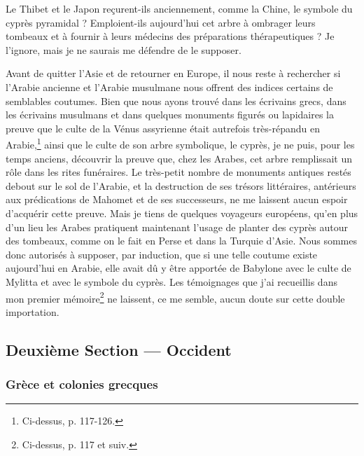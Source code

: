 \documentclass{article}
\begin{document}
Le Thibet et le Japon reçurent-ils anciennement, comme la Chine, le symbole du cyprès pyramidal ? Emploient-ils aujourd'hui cet arbre à ombrager leurs tombeaux et à fournir à leurs médecins des préparations thérapeutiques ? Je l'ignore, mais je ne saurais me défendre de le supposer.

Avant de quitter l'Asie et de retourner en Europe, il nous reste à rechercher si l'Arabie ancienne et l'Arabie musulmane nous offrent des indices certains de semblables coutumes. Bien que nous ayons trouvé dans les écrivains grecs, dans les écrivains musulmans et dans quelques monuments figurés ou lapidaires la preuve que le culte de la Vénus assyrienne était autrefois très-répandu en Arabie,\footnote{Ci-dessus, p. 117-126.} ainsi que le culte de son arbre symbolique, le cyprès, je ne puis, pour les temps anciens, découvrir la preuve que, chez les Arabes, cet arbre remplissait un rôle dans les rites funéraires. Le très-petit nombre de monuments antiques restés debout sur le sol de l'Arabie, et la destruction de ses trésors littéraires, antérieurs aux prédications de Mahomet et de ses successeurs, ne me laissent aucun espoir d'acquérir cette preuve. Mais je tiens de quelques voyageurs européens, qu'en plus d'un lieu les Arabes pratiquent maintenant l'usage de planter des cyprès autour des tombeaux, comme on le fait en Perse et dans la Turquie d'Asie. Nous sommes donc autorisés à supposer, par induction, que si une telle coutume existe aujourd'hui en Arabie, elle avait dû y être apportée de Babylone avec le culte de Mylitta et avec le symbole du cyprès. Les témoignages que j'ai recueillis dans mon premier mémoire\footnote{Ci-dessus, p. 117 et suiv.} ne laissent, ce me semble, aucun doute sur cette double importation.

\clearpage

\subsection{Deuxième Section --- Occident}
\subsubsection{Grèce et colonies grecques}
\end{document}
